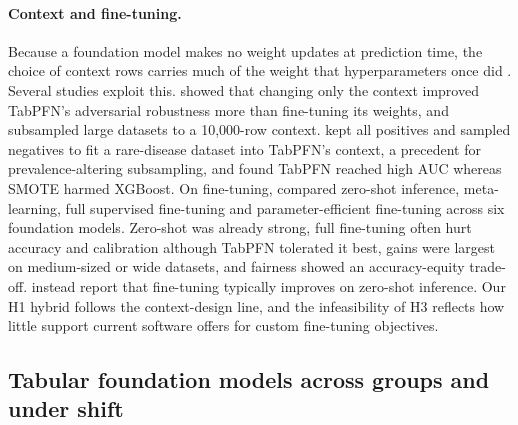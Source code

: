 \documentclass[11pt]{article}
\begin{document}
\paragraph{Context and fine-tuning.} Because a foundation model makes no weight updates at prediction time, the choice of context rows carries much of the weight that hyperparameters once did \citep[p.~19]{kurashkin2026current}. Several studies exploit this. \citet{djilani2026robustness} showed that changing only the context improved TabPFN's adversarial robustness more than fine-tuning its weights, and subsampled large datasets to a 10,000-row context. \citet{fieggen2025navigating} kept all positives and sampled negatives to fit a rare-disease dataset into TabPFN's context, a precedent for prevalence-altering subsampling, and found TabPFN reached high AUC whereas SMOTE harmed XGBoost. On fine-tuning, \citet{tanna2026exploring} compared zero-shot inference, meta-learning, full supervised fine-tuning and parameter-efficient fine-tuning across six foundation models. Zero-shot was already strong, full fine-tuning often hurt accuracy and calibration although TabPFN tolerated it best, gains were largest on medium-sized or wide datasets, and fairness showed an accuracy-equity trade-off. \citet{jiang2026representation} instead report that fine-tuning typically improves on zero-shot inference. Our H1 hybrid follows the context-design line, and the infeasibility of H3 reflects how little support current software offers for custom fine-tuning objectives.

\subsection{Tabular foundation models across groups and under shift}
\end{document}
